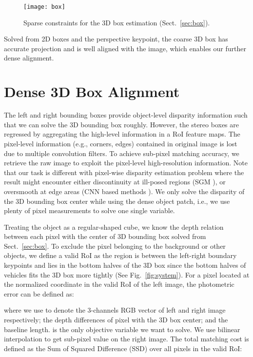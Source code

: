 \documentclass[10pt,twocolumn,letterpaper]{article}
\begin{document}
	
	\begin{figure}
		\begin{center}
			\texttt{[image: box]}
		\end{center}
		\caption{Sparse constraints for the 3D box estimation (Sect.~\ref{sec:box}).}
		\label{fig:box}
	\end{figure}
	Solved from 2D boxes and the perspective keypoint, the coarse 3D box has accurate projection and is well aligned with the image, which enables our further dense alignment.
	\section{Dense 3D Box Alignment}
	\label{sec:dense}
	The left and right bounding boxes provide object-level disparity information such that we can solve the 3D bounding box roughly. However, the stereo boxes are regressed by aggregating the high-level information in a  RoI feature maps. The pixel-level information (e.g., corners, edges) contained in original image is lost due to multiple convolution filters. To achieve sub-pixel matching accuracy, we retrieve the raw image to exploit the pixel-level high-resolution information. Note that our task is different with pixel-wise disparity estimation problem where the result might encounter either discontinuity at ill-posed regions (SGM \cite{hirschmuller2008stereo}), or oversmooth at edge areas (CNN based methods \cite{zbontar2016stereo,kendall2017end,chang2018pyramid}). We only solve the disparity of the 3D bounding box center while using the dense object patch, i.e., we use plenty of pixel measurements to solve one single variable.
	
	Treating the object as a regular-shaped cube, we know the depth relation between each pixel with the center of 3D bounding box solved from Sect.~\ref{sec:box}. To exclude the pixel belonging to the background or other objects, we define a valid RoI as the region is between the left-right boundary keypoints and lies in the bottom halves of the 3D box since the bottom halves of vehicles fits the 3D box more tightly (See Fig.~\ref{fig:system}). For a pixel located at the normalized coordinate   in the valid RoI of the left image, the photometric error can be defined as:
	
	where we use  to denote the 3-channels RGB vector of left and right image respectively;  the depth differences of pixel  with the 3D box center; and  the baseline length.  is the only objective variable we want to solve. We use bilinear interpolation to get sub-pixel value on the right image. The total matching cost is defined as the Sum of Squared Difference (SSD) over all pixels in the valid RoI: 
	
\end{document}
